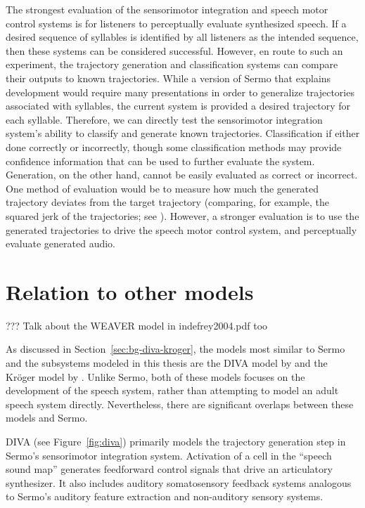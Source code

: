 The strongest evaluation
of the sensorimotor integration
and speech motor control systems
is for listeners to perceptually evaluate
synthesized speech.
If a desired sequence of syllables
is identified by all listeners
as the intended sequence,
then these systems can be considered successful.
However, en route to such an experiment,
the trajectory generation and classification systems
can compare their outputs to known trajectories.
While a version of Sermo
that explains development
would require many presentations
in order to generalize trajectories
associated with syllables,
the current system
is provided a desired trajectory
for each syllable.
Therefore, we can directly
test the sensorimotor integration system's
ability to classify
and generate known trajectories.
Classification if either done
correctly or incorrectly,
though some classification methods
may provide confidence information
that can be used to further evaluate the system.
Generation, on the other hand,
cannot be easily evaluated
as correct or incorrect.
One method of evaluation would be to
measure how much the generated trajectory
deviates from the target trajectory
(comparing, for example,
the squared jerk of the trajectories;
see \citealt{hogan2009}).
However, a stronger evaluation
is to use the generated trajectories
to drive the speech motor control system,
and perceptually evaluate generated audio.

\section{Relation to other models}

??? Talk about the WEAVER model in indefrey2004.pdf too

As discussed in Section~\ref{sec:bg-diva-kroger},
the models most similar to Sermo
and the subsystems modeled in this thesis
are the DIVA model by \citeauthor{guenther1995}
and the Kr\"{o}ger model by \citeauthor{kroger2009}.
Unlike Sermo, both of these models
focuses on the development of the speech system,
rather than attempting to model
an adult speech system directly.
Nevertheless, there are significant overlaps
between these models and Sermo.

DIVA (see Figure~\ref{fig:diva}) primarily models
the trajectory generation step
in Sermo's sensorimotor integration system.
Activation of a cell in the ``speech sound map''
generates feedforward control signals
that drive an articulatory synthesizer.
It also includes auditory somatosensory feedback systems
analogous to Sermo's auditory feature extraction
and non-auditory sensory systems.

